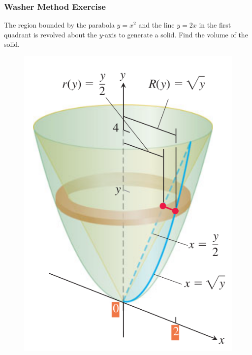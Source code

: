 \documentclass[xcolor=dvipsnames]{beamer}
\begin{document}
\begin{frame}
  \frametitle{Washer Method Exercise}
{\ubung} The region bounded by the parabola $y=x^{2}$ and the line
$y=2x$ in the first quadrant is revolved about the $y$-axis to
generate a solid. Find the volume of the solid.
\begin{figure}[h]
  \includegraphics[scale=0.25]{./diagrams/radii.png}
\end{figure}
\end{frame}
\end{document}
